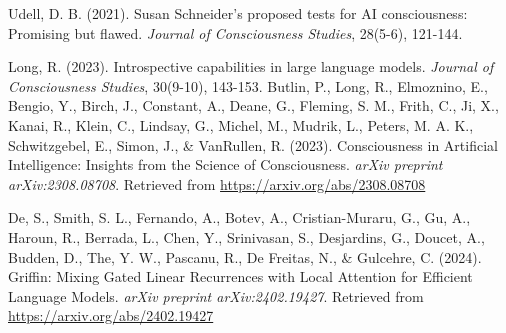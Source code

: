 \documentclass{article}
\begin{document}
\begin{thebibliography}{99}
Udell, D. B. (2021). Susan Schneider's proposed tests for AI consciousness: Promising but flawed. \textit{Journal of Consciousness Studies}, 28(5-6), 121-144.

Long, R. (2023). Introspective capabilities in large language models. \textit{Journal of Consciousness Studies}, 30(9-10), 143-153.
Butlin, P., Long, R., Elmoznino, E., Bengio, Y., Birch, J., Constant, A., Deane, G., Fleming, S. M., Frith, C., Ji, X., Kanai, R., Klein, C., Lindsay, G., Michel, M., Mudrik, L., Peters, M. A. K., Schwitzgebel, E., Simon, J., \& VanRullen, R. (2023). Consciousness in Artificial Intelligence: Insights from the Science of Consciousness. \textit{arXiv preprint arXiv:2308.08708}. Retrieved from \url{https://arxiv.org/abs/2308.08708}

De, S., Smith, S. L., Fernando, A., Botev, A., Cristian-Muraru, G., Gu, A., Haroun, R., Berrada, L., Chen, Y., Srinivasan, S., Desjardins, G., Doucet, A., Budden, D., The, Y. W., Pascanu, R., De Freitas, N., \& Gulcehre, C. (2024). Griffin: Mixing Gated Linear Recurrences with Local Attention for Efficient Language Models. \textit{arXiv preprint arXiv:2402.19427}. Retrieved from \url{https://arxiv.org/abs/2402.19427}

\end{thebibliography}
\end{document}
